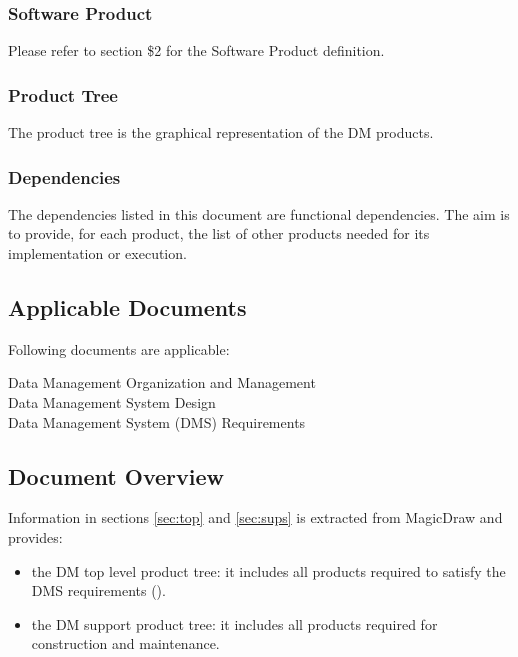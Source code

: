 \subsubsection{Software Product} \label{sec:swproduct}

Please refer to  section \$2 for the Software Product definition.


\subsubsection{Product Tree} \label{sec:ptree}

The product tree is the graphical representation of the DM products.


\subsubsection{Dependencies} \label{sec:dependencies}

The dependencies listed in this document are functional dependencies.
The aim is to provide, for each product, the list of other products needed for its implementation or execution. 


\subsection{Applicable Documents}

Following documents are applicable:

 Data Management Organization and Management\\
 Data Management System Design\\
 Data Management System (DMS) Requirements


\subsection{Document Overview}

Information in sections \ref{sec:top} and \ref{sec:sups} is extracted from MagicDraw and provides:

\begin{itemize}
\item the DM top level product tree: it includes all products required to satisfy the DMS requirements ().
\item the DM support product tree: it includes all products required for construction and maintenance.
\end{itemize}

